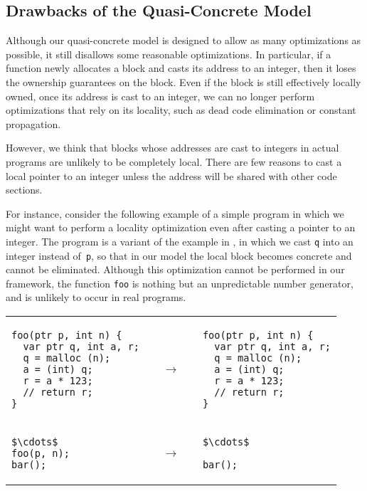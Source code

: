 \subsection{Drawbacks of the Quasi-Concrete Model}
\label{idea:downside}

Although our quasi-concrete model is designed to allow as many optimizations as possible, it still disallows some reasonable optimizations. 
In particular, if a function newly allocates a block and casts its address to an
integer, then it loses the ownership guarantees on the block. 
Even if the block is still effectively locally owned, 
once its address is cast to an integer, we can no longer perform optimizations that rely on its locality, such as dead code elimination or constant propagation. 

However, we think that blocks whose addresses are cast to
integers in actual programs are unlikely to be completely local. There are few reasons to cast a local pointer to an integer unless the address will be shared with other code sections. 

For instance, consider the following example of a simple program in which we might want to perform a locality optimization even after casting a pointer to an integer.
The program is a variant of 
the example in , in which we cast \texttt{q} into an integer instead of~\texttt{p},
so that in our model the local block becomes concrete and cannot be eliminated.
Although this optimization cannot be performed in our framework, the function \texttt{foo} is nothing but an %
unpredictable number generator, and is unlikely to occur in real programs.

\begin{center}
\begin{tabular}{@{}l@{}l@{}l@{}}
\begin{lstlisting}
foo(ptr p, int n) {
  var ptr q, int a, r;
  q = malloc (n);
  a = (int) q;
  r = a * 123;
  // return r;
}
\end{lstlisting}
&
$\quad\rightarrow\quad$
&
\begin{lstlisting}
foo(ptr p, int n) {
  var ptr q, int a, r;
  q = malloc (n);
  a = (int) q;
  r = a * 123;
  // return r;
}
\end{lstlisting}
\\
\begin{lstlisting}
$\cdots$
foo(p, n);
bar();
\end{lstlisting}
&
$\quad\rightarrow\quad$
&
\begin{lstlisting}
$\cdots$

bar();
\end{lstlisting}
\end{tabular}
\end{center}

